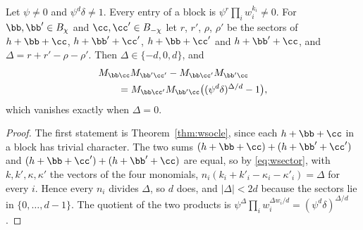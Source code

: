 \begin{lemma}\label{lem:wminor}
Let $\psi\ne0$ and $\psi^d\delta\ne1$. Every entry of a block is
$\psi^r\prod_iw_i^{k_i}\ne0$. For $\bb,\bb'\in B_\chi$ and
$\cc,\cc'\in B_{-\chi}$ let $r$, $r'$, $\rho$, $\rho'$ be the sectors of
$h+\bb+\cc$, $h+\bb'+\cc'$, $h+\bb+\cc'$ and $h+\bb'+\cc$, and
$\Delta=r+r'-\rho-\rho'$. Then $\Delta\in\{-d,0,d\}$, and
\[
\begin{aligned}
&M_{\bb\cc}M_{\bb'\cc'}-M_{\bb\cc'}M_{\bb'\cc}\\
&\qquad=M_{\bb\cc'}M_{\bb'\cc}\big((\psi^d\delta)^{\Delta/d}-1\big),
\end{aligned}
\]
which vanishes exactly when $\Delta=0$.
\end{lemma}

\begin{proof}
The first statement is Theorem~\ref{thm:wsocle}, since each
$h+\bb+\cc$ in a block has trivial character. The two sums
$(h+\bb+\cc)+(h+\bb'+\cc')$ and $(h+\bb+\cc')+(h+\bb'+\cc)$ are equal, so
by \eqref{eq:wsector}, with $k,k',\kappa,\kappa'$ the vectors of the four
monomials, $n_i(k_i+k'_i-\kappa_i-\kappa'_i)=\Delta$ for every $i$. Hence
every $n_i$ divides $\Delta$, so $d$ does, and $|\Delta|<2d$ because the
sectors lie in $\{0,\dots,d-1\}$. The quotient of the two products is
$\psi^{\Delta}\prod_iw_i^{\Delta w_i/d}=(\psi^d\delta)^{\Delta/d}$.
\end{proof}

